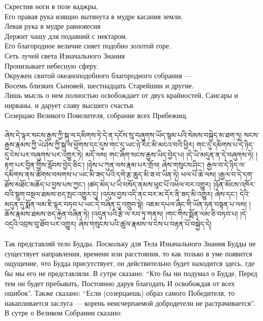 Скрестив ноги в позе ваджры,\\
Его правая рука изящно вытянута в мудре касания земли,\\
Левая рука в мудре равновесия\\
Держит чашу для подаяний с нектаром.\\
Его благородное величие сияет подобно золотой горе.\\
Сеть лучей света Изначального Знания\\
Пронизывает небесную сферу.\\
Окружен свитой океаноподобного благородного собрания —\\
Восемь близких Сыновей, шестнадцать Старейшин и другие.\\
Лишь мысль о нем полностью освобождает от двух крайностей,
Сансары и нирваны, и дарует славу высшего счастья.\\
Созерцаю Великого Повелителя, собрание всех Прибежищ.\\
\\
\scriptsize
\ti
ཞེས་དེ་ལྟར་སངས་རྒྱས་ཀྱི་སྐུ་ལ་དམིགས་ཏེ་དེ་ན་དངོས་སུ་བཞུགས་ཡོད་སྙམ་པའི་སེམས་བསྐྱེད་མ་ཐག་ཏུ། 
སངས་རྒྱས་རྣམས་ཀྱི་ཡེ་ཤེས་ཀྱི་སྐུ་ལ་ཕྱོགས་དང་དུས་གང་དུ་ཡང་ཉེ་རིང་མི་མངའ་བའི་ཕྱིར། 
གང་དུ་དམིགས་པ་དེ་ཉིད་དུ་ངེས་པར་བཞུགས་པར་འགྱུར་ཏེ། མདོ་ལས། གང་ཞིག་སངས་རྒྱས་ཡིད་བྱེད་པ། 
།དེ་ཡི་མདུན་ན་དེ་བཞུགས་ཏེ། །རྟག་པར་བྱིན་གྱིས་རློབས་བྱེད་ཅིང་། 
།ཉེས་པ་ཀུན་ལས་རྣམ་པར་གྲོལ། ཞེས་གསུངས་ཤིང་། 
རྒྱལ་བ་དེ་ཉིད་ལ་དམིགས་ནས་ཚོགས་བསགས་པ་ཡང་མི་ཟད་པའི་དགེ་རྩ་ཆུད་མི་ཟ་བ་ཡིན་ཏེ། 
ཕལ་པོ་ཆེ་ལས། །རྒྱལ་བ་དེ་དག་ཐོས་མཐོང་མཆོད་པ་བྱས་པས་ཀྱང་།
།ཚད་མེད་པ་ཡི་བསོད་ནམས་ཕུང་པོ་འཕེལ་བར་འགྱུར། 
།ཉོན་མོངས་འཁོར་བའི་སྡུག་བསྔལ་ཐམས་ཅད་སྤང་འགྱུར་དུ། 
།འདུས་བྱས་འདི་ནང་བར་མ་དོར་ནི་ཟད་མི་འགྱུར། ཞེས་དང་། 
དེའི་མདུན་དུ་སྨོན་ལམ་ཇི་ལྟར་བཏབ་པ་ཡང་དེ་བཞིན་དུ་འགྲུབ་སྟེ། 
འཇམ་དཔལ་ཞིང་གི་ཡོན་ཏན་བསྟན་པ་ལས། །ཆོས་རྣམས་ཐམས་ཅད་རྐྱེན་བཞིན་ཏེ། 
།འདུན་པའི་རྩེ་ལ་རབ་ཏུ་གནས། །གང་གིས་སྨོན་ལམ་ཅི་བཏབ་པ། 
།དེ་འདྲའི་འབྲས་བུ་ཐོབ་པར་འགྱུར། ཞེས་གསུངས་པའི་ཚུལ་རྣམས་ལ་ངེས་པ་བརྟན་པོ་བསྐྱེད་དེ།\\
\\
\ru
Так представляй тело Будды. Поскольку для Тела Изначального Знания Будды не существует направления,
времени или расстояния, то как только в уме появится ощущение, что Будда присутствует,
он действительно будет находится здесь, где бы мы его не представляли. В сутре сказано:
“Кто бы ни подумал о Будде,
Перед тем он будет пребывать,
Постоянно даруя благодать
И освобождая от всех ошибок”.
Также сказано:
“Если (созерцаешь) образ самого Победителя, то накапливается заслуга — корень неисчерпаемой
добродетели не растрачивается”.
В сутре о Великом Собрании сказано:
